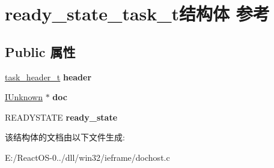\hypertarget{structready__state__task__t}{}\section{ready\+\_\+state\+\_\+task\+\_\+t结构体 参考}
\label{structready__state__task__t}
\subsection*{Public 属性}
\begin{DoxyCompactItemize}
\item 
\mbox{\label{structready__state__task__t_a7a035920bd307da4c728a4d8c7c390ac}} 
\hyperlink{structtask__header__t}{task\+\_\+header\+\_\+t} {\bfseries header}
\item 
\mbox{\label{structready__state__task__t_a58e5231978101ae40054c154acfb4116}} 
\hyperlink{interface_i_unknown}{I\+Unknown} $\ast$ {\bfseries doc}
\item 
\mbox{\label{structready__state__task__t_aa9e68281f735a7fcb8ef9e2c7bb6c5a3}} 
R\+E\+A\+D\+Y\+S\+T\+A\+TE {\bfseries ready\+\_\+state}
\end{DoxyCompactItemize}


该结构体的文档由以下文件生成\+:\begin{DoxyCompactItemize}
\item 
E\+:/\+React\+O\+S-\/0../dll/win32/ieframe/dochost.\+c\end{DoxyCompactItemize}
